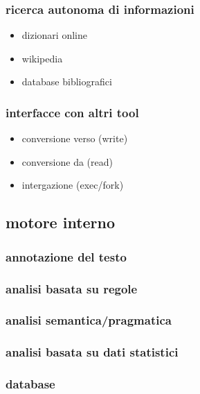 \subsubsection{ricerca autonoma di informazioni}

\begin{itemize}
\item dizionari online
\item wikipedia
\item database bibliografici
\end{itemize}

\subsubsection{interfacce con altri tool}

\begin{itemize}
\item conversione verso (write)
\item conversione da (read)
\item intergazione (exec/fork)
\end{itemize}

\subsection{motore interno}

\subsubsection{annotazione del testo}
\subsubsection{analisi basata su regole}
\subsubsection{analisi semantica/pragmatica}
\subsubsection{analisi basata su dati statistici}
\subsubsection{database}

